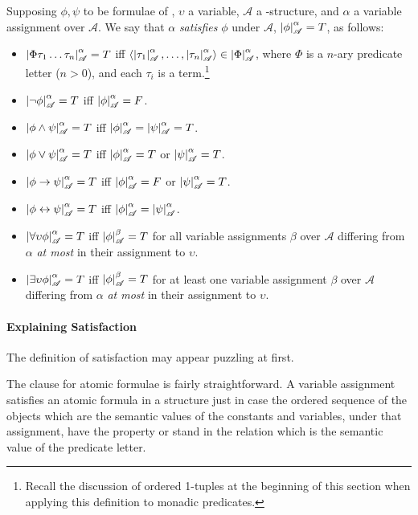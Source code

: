 \begin{definition}[Satisfaction]
Supposing $\phi,\psi$ to be formulae of \ltwo, $\upsilon$ a variable, $\mathscr{A}$ a \ltwo-structure, and $\alpha$ a variable assignment over $\mathscr{A}$. We say that $\alpha$ \emph{satisfies} $\phi$ under $\mathscr{A}$, $\left|\phi\right|^{\alpha}_{\mathscr{A}}=T$, as follows: \begin{itemize}
	\item $\left|\Phi\tau_{1}\ldots\tau_{n}\right|^{\alpha}_{\mathscr{A}}=T$ iff $\langle \left|\tau_{1}\right|^{\alpha}_{\mathscr{A}},\ldots,\left|\tau_{n}\right|^{\alpha}_{\mathscr{A}}\rangle \in \left|\Phi\right|^{\alpha}_{\mathscr{A}}$, where $\Phi$ is a $n$-ary predicate letter ($n>0$), and each $\tau_{i}$ is a term.\footnote{Recall the discussion of ordered 1-tuples at the beginning of this section when applying this definition to monadic predicates.}
	\item $\left|\neg\phi\right|^{\alpha}_{\mathscr{A}}=T$ iff $\left|\phi\right|^{\alpha}_{\mathscr{A}}=F$.
	\item $\left|\phi\wedge\psi\right|^{\alpha}_{\mathscr{A}}=T$ iff $\left|\phi\right|^{\alpha}_{\mathscr{A}}=\left|\psi\right|^{\alpha}_{\mathscr{A}}=T$.
	\item $\left|\phi\vee\psi\right|^{\alpha}_{\mathscr{A}}=T$ iff $\left|\phi\right|^{\alpha}_{\mathscr{A}}=T$ or $\left|\psi\right|^{\alpha}_{\mathscr{A}}=T$.
	\item $\left|\phi\to\psi\right|^{\alpha}_{\mathscr{A}}=T$ iff $\left|\phi\right|^{\alpha}_{\mathscr{A}}=F$ or $\left|\psi\right|^{\alpha}_{\mathscr{A}}=T$.
	\item $\left|\phi\leftrightarrow\psi\right|^{\alpha}_{\mathscr{A}}=T$ iff $\left|\phi\right|^{\alpha}_{\mathscr{A}}=\left|\psi\right|^{\alpha}_{\mathscr{A}}$.
	\item $\left|\forall \upsilon\phi\right|^{\alpha}_{\mathscr{A}}=T$ iff $\left|\phi\right|^{\beta}_{\mathscr{A}}=T$ for all variable assignments $\beta$ over $\mathscr{A}$ differing from $\alpha$ \emph{at most} in their assignment to $\upsilon$.
		\item $\left|\exists \upsilon\phi\right|^{\alpha}_{\mathscr{A}}=T$ iff $\left|\phi\right|^{\beta}_{\mathscr{A}}=T$ for at least one variable assignment $\beta$ over $\mathscr{A}$ differing from $\alpha$ \emph{at most} in their assignment to $\upsilon$.
\end{itemize}
\end{definition}

\paragraph{Explaining Satisfaction}

The definition of satisfaction may appear puzzling at first.

The clause for atomic formulae is fairly straightforward. A variable assignment satisfies an atomic formula in a structure just in case the ordered sequence of the  objects which are the semantic values of the constants and variables, under that assignment, have the property or stand in the  relation which is the semantic value of the predicate letter. 


